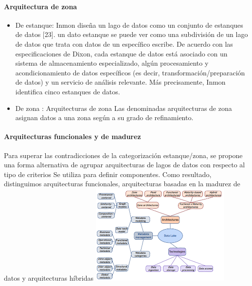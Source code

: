 \documentclass[twoside,twocolumn]{article}
\begin{document}
\paragraph{Arquitectura de zona}
\begin{itemize}
    \item De estanque: Inmon diseña un lago de datos como un conjunto de estanques de datos [23]. un dato estanque se puede ver como una subdivisión de un lago de datos que trata con datos de un específico escribe. De acuerdo con las especificaciones de Dixon, cada estanque de datos está asociado con un sistema de almacenamiento especializado, algún procesamiento y acondicionamiento de datos específicos (es decir, transformación/preparación de datos) y un servicio de análisis relevante. Más precisamente, Inmon identifica cinco estanques de datos.
    \item  De zona : Arquitecturas de zona Las denominadas arquitecturas de zona asignan datos a una zona según a su grado de refinamiento.
\end{itemize}
\paragraph{Arquitecturas funcionales y de madurez}
Para superar las contradicciones de la categorización estanque/zona, se propone una forma alternativa de agrupar arquitecturas de lagos de datos con respecto al tipo de criterios Se utiliza para definir componentes. Como resultado, distinguimos arquitecturas funcionales, arquitecturas basadas en la madurez de datos y arquitecturas híbridas
\includegraphics[width=7cm]{imagenes/imagen4.png}
\end{document}
